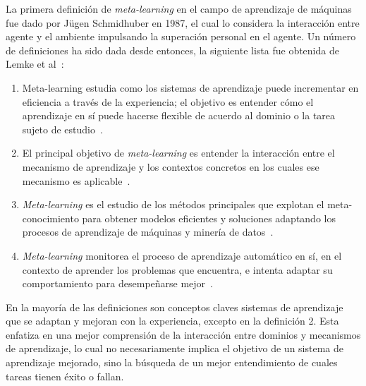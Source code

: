 
La primera definición de \textit{meta-learning} en el campo de aprendizaje de máquinas fue dado por J\"ugen Schmidhuber en 1987, el cual lo considera la interacción entre agente y el ambiente impulsando la superación personal en el agente. Un número de definiciones ha sido dada desde entonces, la siguiente lista fue obtenida de Lemke et al~\cite{lemke2013metalearning}:

\begin{enumerate}
	\item Meta-learning estudia como los sistemas de aprendizaje puede incrementar en eficiencia a través de la experiencia; el objetivo es entender cómo el aprendizaje en sí puede hacerse flexible de acuerdo al dominio o la tarea sujeto de estudio~\cite{vilalta2001perspective}.
	\item El principal objetivo de \emph{meta-learning} es entender la interacción entre el mecanismo de aprendizaje y los contextos concretos en los cuales ese mecanismo es aplicable~\cite{giraud2008metalearning}.
	\item \emph{Meta-learning} es el estudio de los métodos principales que explotan el meta-conocimiento para obtener modelos eficientes y soluciones adaptando los procesos de aprendizaje de máquinas y minería de datos~\cite{bradzil2009metalearning}.
	\item \emph{Meta-learning} monitorea el proceso de aprendizaje automático en sí, en el contexto de aprender los problemas que encuentra, e intenta adaptar su comportamiento para desempeñarse mejor~\cite{vanschoren2010understanding}.
\end{enumerate}

En la mayoría de las definiciones son conceptos claves sistemas de aprendizaje que se adaptan y mejoran con la experiencia, excepto en la definición 2. Esta enfatiza en una mejor comprensión de la interacción entre dominios y mecanismos de aprendizaje, lo cual no necesariamente implica el objetivo de un sistema de aprendizaje mejorado, sino la búsqueda de un mejor entendimiento de cuales tareas tienen éxito o fallan.

